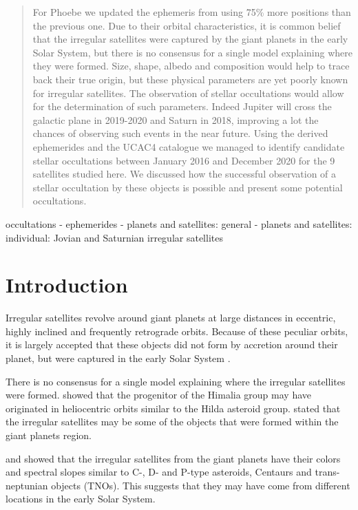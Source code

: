 \documentclass[useAMS,usenatbib]{mn2e}
\begin{document}
\begin{abstract}
For Phoebe we updated the ephemeris from \cite{Desmars2013} using 75\% more positions than the previous one. Due to their orbital characteristics, it is common belief that the irregular satellites were captured by the giant planets in the early Solar System, but there is no consensus for a single model explaining where they were formed. Size, shape, albedo and composition would help to trace back their true origin, but these physical parameters are yet poorly known for irregular satellites. The observation of stellar occultations would allow for the determination of such parameters. Indeed Jupiter will cross the galactic plane in 2019-2020 and Saturn in 2018, improving a lot the chances of observing such events in the near future. Using the derived ephemerides and the UCAC4 catalogue we managed to identify \noccs candidate stellar occultations between January 2016 and December 2020 for the 9 satellites studied here. We discussed how the successful observation of a stellar occultation by these objects is possible and present some potential occultations.
\end{abstract}

\begin{keywords}
occultations - ephemerides - planets and satellites: general - planets and satellites: individual: Jovian and Saturnian irregular satellites
\end{keywords}

\section{Introduction}\label{Sec: introducao}

Irregular satellites revolve around giant planets at large distances in eccentric, highly inclined and frequently retrograde orbits. Because of these peculiar orbits, it is largely accepted that these objects did not form by accretion around their planet, but were captured in the early Solar System \citep{Sheppard2005}.

There is no consensus for a single model explaining where the irregular satellites were formed. \cite{Cuk2004} showed that the progenitor of the Himalia group may have originated in heliocentric orbits similar to the Hilda asteroid group. \cite{Sheppard2005} stated that the irregular satellites may be some of the objects that were formed within the giant planets region.

\cite{Grav2003} and \cite{Grav2007} showed that the irregular satellites from the giant planets have their colors and spectral slopes similar to C-, D- and P-type asteroids, Centaurs and trans-neptunian objects (TNOs). This suggests that they may have come from different locations in the early Solar System.
\end{document}
